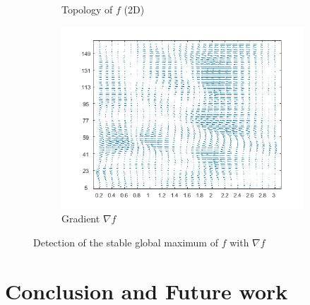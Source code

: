 \documentclass[11pt,a4,twosided,singlespacing,titlepagenumber=on]{scrreprt}
\numberwithin{equation}{chapter} %
\theoremstyle{remark}
\begin{document}
\begin{figure}[H]
\begin{subfigure}[t]{0.49\textwidth}
        \caption{Topology of $f$ (2D)}
        \label{vol_mod_sma}
    \end{subfigure}
    \begin{subfigure}[t]{0.49\textwidth}
        \centering
        \includegraphics[width=1\textwidth]{surf/3}
        \caption{Gradient $\nabla f$}
        \label{vol_mod_sma}
    \end{subfigure}
    \caption{Detection of the stable global maximum of $f$ with $\nabla f$}
    \label{fig:sharpe_ratio_topology}
\end{figure}

\chapter{Conclusion and Future work}
\end{document}
